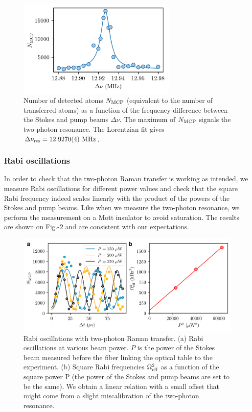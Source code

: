 \begin{figure}
    \centering
    \includegraphics[width=0.7\textwidth]{Fig/Chapter3/raman_res.png}
    \caption{Number of detected atoms $N_{\rm{MCP}}$ (equivalent to the number of transferred atoms) as a function of the frequency difference between the Stokes and pump beams $\Delta \nu$. The maximum of $N_{\rm{MCP}}$ signals the two-photon resonance. The Lorentzian fit gives $\Delta \nu_{\rm{res}} = 12.9270(4) \ \rm{MHz}$.}
    \label{fig:raman_resonance}
\end{figure}

\subsubsection{Rabi oscillations}

In order to check that the two-photon Raman transfer is working as intended, we measure Rabi oscillations for different power values and check that the square Rabi frequency indeed scales linearly with the product of the powers of the Stokes and pump beams. Like when we measure the two-photon resonance, we perform the measurement on a Mott insulator to avoid saturation. The results are shown on Fig.-\ref{fig:rabi_flop} and are consistent with our expectations.

\begin{figure}
    \centering
    \includegraphics[width=\textwidth]{Fig/Chapter3/rabi_flop.png}
    \caption{Rabi oscillations with two-photon Raman transfer. (a) Rabi oscillations at various beam power. $P$ is the power of the Stokes beam measured before the fiber linking the optical table to the experiment. (b) Square Rabi frequencies $\Omega^2_{\rm{eff}}$ as a function of the square power P (the power of the Stokes and pump beams are set to be the same). We obtain a linear relation with a small offset that might come from a slight miscalibration of the two-photon resonance.}
    \label{fig:rabi_flop}
\end{figure}

